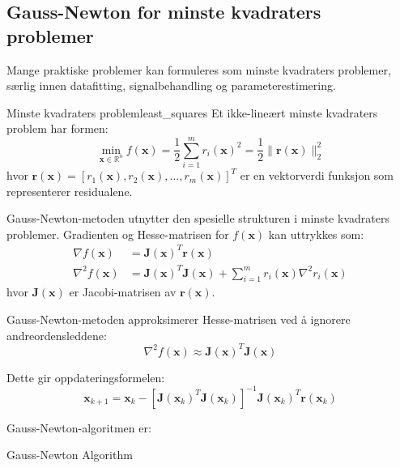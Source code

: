 \subsection{Gauss-Newton for minste kvadraters problemer}
\label{subsec:gauss_newton}

Mange praktiske problemer kan formuleres som minste kvadraters problemer, særlig innen datafitting, signalbehandling og parameterestimering.

\begin{definition}{Minste kvadraters problem}{least_squares}
	Et ikke-lineært minste kvadraters problem har formen:
	\[
		\min_{\symbf{x} \in \mathbb{R}^n} f(\symbf{x}) = \frac{1}{2}\sum_{i=1}^m r_i(\symbf{x})^2 = \frac{1}{2}\|\symbf{r}(\symbf{x})\|_2^2
	\]
	hvor $\symbf{r}(\symbf{x}) = [r_1(\symbf{x}), r_2(\symbf{x}), \ldots, r_m(\symbf{x})]^T$ er en vektorverdi funksjon som representerer residualene.
\end{definition}

Gauss-Newton-metoden utnytter den spesielle strukturen i minste kvadraters problemer. Gradienten og Hesse-matrisen for $f(\symbf{x})$ kan uttrykkes som:
\begin{align*}
	\nabla f(\symbf{x})   & = \symbf{J}(\symbf{x})^T \symbf{r}(\symbf{x})                                                       \\
	\nabla^2 f(\symbf{x}) & = \symbf{J}(\symbf{x})^T \symbf{J}(\symbf{x}) + \sum_{i=1}^m r_i(\symbf{x}) \nabla^2 r_i(\symbf{x})
\end{align*}
hvor $\symbf{J}(\symbf{x})$ er Jacobi-matrisen av $\symbf{r}(\symbf{x})$.

Gauss-Newton-metoden approksimerer Hesse-matrisen ved å ignorere andreordensleddene:
\[
	\nabla^2 f(\symbf{x}) \approx \symbf{J}(\symbf{x})^T \symbf{J}(\symbf{x})
\]

Dette gir oppdateringsformelen:
\begin{equation}
	\symbf{x}_{k+1} = \symbf{x}_k - [\symbf{J}(\symbf{x}_k)^T \symbf{J}(\symbf{x}_k)]^{-1} \symbf{J}(\symbf{x}_k)^T \symbf{r}(\symbf{x}_k)
\end{equation}

Gauss-Newton-algoritmen er:

\begin{algorithm}[H]
	\SetAlgoLined
	\caption{Gauss-Newton Algorithm}
	\label{alg:gauss_newton}
\end{algorithm}


